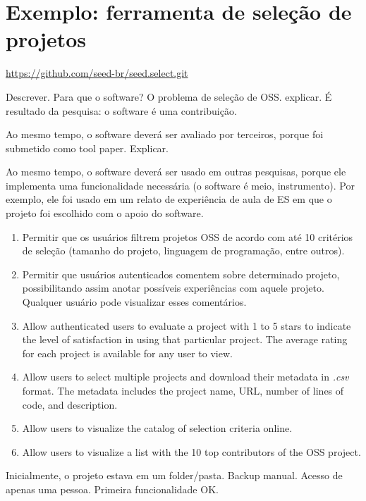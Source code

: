 \section{Exemplo: ferramenta de seleção de projetos}


\url{https://github.com/seed-br/seed.select.git}

Descrever.
Para que o software? 
O problema de seleção de OSS. explicar. 
É resultado da pesquisa: o software é uma contribuição.

Ao mesmo tempo, o software deverá ser avaliado por terceiros, porque foi submetido como tool paper. Explicar.

Ao mesmo tempo, o software deverá ser usado em outras pesquisas, porque ele implementa uma funcionalidade necessária (o software é meio, instrumento).
Por exemplo, ele foi usado em um relato de experiência de aula de ES em que o projeto foi escolhido com o apoio do software.

\begin{enumerate}

    \item Permitir que os usuários filtrem projetos OSS de acordo com até 10 critérios de seleção (tamanho do projeto, linguagem de programação, entre outros).
    
    \item Permitir que usuários autenticados comentem sobre determinado projeto, possibilitando assim anotar possíveis experiências com aquele projeto. Qualquer usuário pode visualizar esses comentários.
    
    \item Allow authenticated users to evaluate a project with 1 to 5 stars to indicate the level of satisfaction in using that particular project. The average rating for each project is available for any user to view.
    
    \item Allow users to select multiple projects and download their metadata in \textit{.csv} format. The metadata includes the project name, URL, number of lines of code, and description.
    
    \item Allow users to visualize the catalog of selection criteria online. 

    \item Allow users to visualize a list with the 10 top contributors of the OSS project.
\end{enumerate}


Inicialmente, o projeto estava em um folder/pasta.
Backup manual. Acesso de apenas uma pessoa.
Primeira funcionalidade OK.

